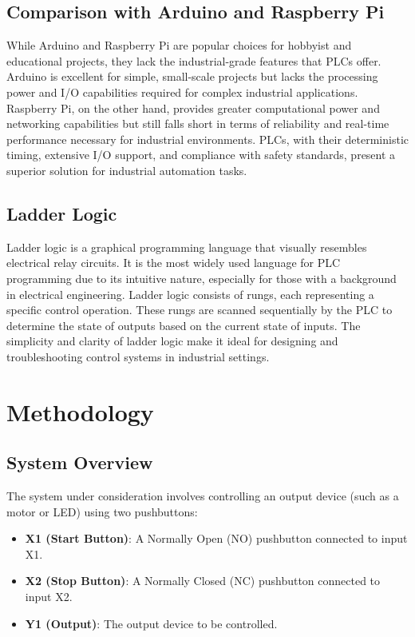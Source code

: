 \documentclass[12pt]{article}
\begin{document}
\subsection{Comparison with Arduino and Raspberry Pi}

While Arduino and Raspberry Pi are popular choices for hobbyist and educational projects, they lack the industrial-grade features that PLCs offer. Arduino is excellent for simple, small-scale projects but lacks the processing power and I/O capabilities required for complex industrial applications. Raspberry Pi, on the other hand, provides greater computational power and networking capabilities but still falls short in terms of reliability and real-time performance necessary for industrial environments. PLCs, with their deterministic timing, extensive I/O support, and compliance with safety standards, present a superior solution for industrial automation tasks.

\subsection{Ladder Logic}

Ladder logic is a graphical programming language that visually resembles electrical relay circuits. It is the most widely used language for PLC programming due to its intuitive nature, especially for those with a background in electrical engineering. Ladder logic consists of rungs, each representing a specific control operation. These rungs are scanned sequentially by the PLC to determine the state of outputs based on the current state of inputs. The simplicity and clarity of ladder logic make it ideal for designing and troubleshooting control systems in industrial settings.

\section{Methodology}

\subsection{System Overview}

The system under consideration involves controlling an output device (such as a motor or LED) using two pushbuttons:

\begin{itemize}
    \item \textbf{X1 (Start Button)}: A Normally Open (NO) pushbutton connected to input X1.
    \item \textbf{X2 (Stop Button)}: A Normally Closed (NC) pushbutton connected to input X2.
    \item \textbf{Y1 (Output)}: The output device to be controlled.
\end{itemize}
\end{document}
